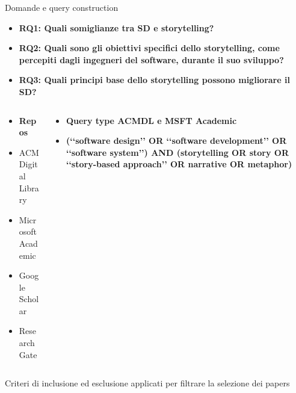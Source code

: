 \documentclass{beamer}
\begin{document}
\begin{frame}[t]
{\centerline{Domande e query construction}}
      \begin{minipage}{\linewidth}
\begin{itemize}[itemsep=1\baselineskip]
    \item {\fontsize{8}{12}\textbf{\textcolor{myred}{RQ1}: Quali somiglianze tra SD e storytelling?}}
    \item {\fontsize{8}{12}\textbf{\textcolor{myred}{RQ2}: Quali sono gli obiettivi specifici dello storytelling, come percepiti dagli ingegneri del software, durante il suo sviluppo?}}
    \item {\fontsize{8}{12}\textbf{\textcolor{myred}{RQ3}: Quali principi base dello storytelling possono migliorare il SD?}}
\end{itemize}

  \begin{columns}
        \begin{column}{0.4\textwidth}
            \begin{itemize}
                \item  {\fontsize{10}{10}\textbf{\textcolor{myyellow}{Repos}}}
                \item ACM Digital Library
                \item Microsoft Academic
                \item Google Scholar
                \item Research Gate
            \end{itemize}
        \end{column}
        \begin{column}{0.6\textwidth}
            \raggedleft
            \begin{itemize}
                \item  {\fontsize{6}{6}\textbf{\textcolor{myyellow}{Query type ACMDL e MSFT Academic}}}
                \item {\fontsize{6}{6}\textbf{(‘‘software design’’ OR ‘‘software development’’ OR ‘‘software
system’’)
AND
(storytelling OR story OR ‘‘story-based approach’’ OR
narrative OR metaphor)}}
                
            \end{itemize}
        \end{column}
    \end{columns}
    \vspace{0.5cm}
Criteri di inclusione ed esclusione applicati per filtrare la selezione dei papers \cite{patino_ferreira_2018}
      \end{minipage}
\end{frame}
\end{document}
